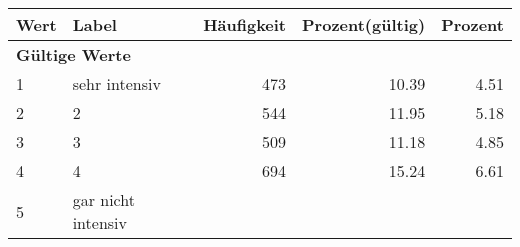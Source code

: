      \begin{longtable}{lXrrr}
     \toprule
     \textbf{Wert} & \textbf{Label} & \textbf{Häufigkeit} & \textbf{Prozent(gültig)} & \textbf{Prozent} \\
     \endhead
     \midrule
     \multicolumn{5}{l}{\textbf{Gültige Werte}}\\

     1 &
     \multicolumn{1}{X}{ sehr intensiv   } &


       \num{473} &
       \num[round-mode=places,round-precision=2]{10,39} &
         \num[round-mode=places,round-precision=2]{4,51} \\

     2 &
     \multicolumn{1}{X}{ 2   } &


       \num{544} &
       \num[round-mode=places,round-precision=2]{11,95} &
         \num[round-mode=places,round-precision=2]{5,18} \\

     3 &
     \multicolumn{1}{X}{ 3   } &


       \num{509} &
       \num[round-mode=places,round-precision=2]{11,18} &
         \num[round-mode=places,round-precision=2]{4,85} \\

     4 &
     \multicolumn{1}{X}{ 4   } &


       \num{694} &
       \num[round-mode=places,round-precision=2]{15,24} &
         \num[round-mode=places,round-precision=2]{6,61} \\

     5 &
     \multicolumn{1}{X}{ gar nicht intensiv   } &



\end{longtable}
